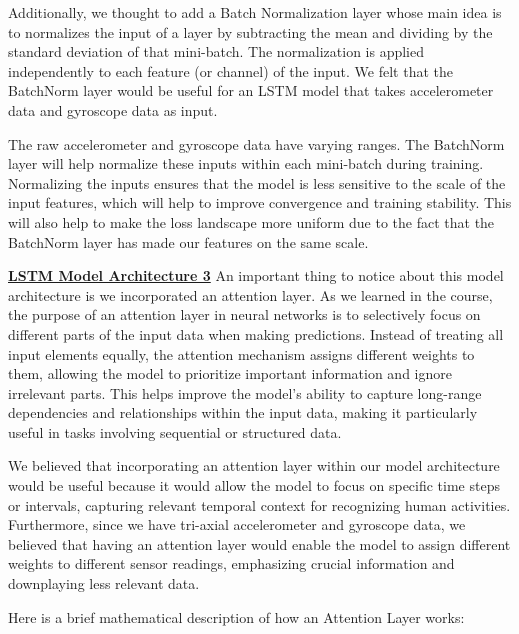\documentclass[conference]{IEEEtran}
\begin{document}
Additionally, we thought to add a Batch Normalization layer whose main idea is to normalizes the input of a layer by subtracting the mean and dividing by the standard deviation of that mini-batch. The normalization is applied independently to each feature (or channel) of the input. We felt that the BatchNorm layer would be useful for an LSTM model that takes accelerometer data and gyroscope data as input. \newline 

The raw accelerometer and gyroscope data have varying ranges. The BatchNorm layer will help normalize these inputs within each mini-batch during training. Normalizing the inputs ensures that the model is less sensitive to the scale of the input features, which will help to improve convergence and training stability. This will also help to make the loss landscape more uniform due to the fact that the BatchNorm layer has made our features on the same scale. \newline 

\textbf{\underline{LSTM Model Architecture 3}} \newline 
An important thing to notice about this model architecture is we incorporated an attention layer. As we learned in the course, the purpose of an attention layer in neural networks is to selectively focus on different parts of the input data when making predictions. Instead of treating all input elements equally, the attention mechanism assigns different weights to them, allowing the model to prioritize important information and ignore irrelevant parts. This helps improve the model's ability to capture long-range dependencies and relationships within the input data, making it particularly useful in tasks involving sequential or structured data. \newline 

We believed that incorporating an attention layer within our model architecture would be useful because it would allow the model to focus on specific time steps or intervals, capturing relevant temporal context for recognizing human activities. Furthermore, since we have tri-axial accelerometer and gyroscope data, we believed that having an attention layer would enable the model to assign different weights to different sensor readings, emphasizing crucial information and downplaying less relevant data. \newline 

Here is a brief mathematical description of how an Attention Layer works: \newline 
\end{document}
